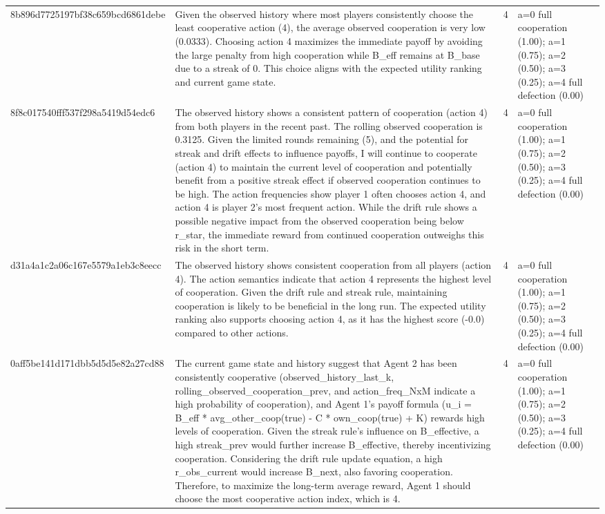 \begin{tabular}{lp{8cm}ll l}
8b896d7725197bf38c659bcd6861debe & Given the observed history where most players consistently choose the least cooperative action (4), the average observed cooperation is very low (0.0333). Choosing action 4 maximizes the immediate payoff by avoiding the large penalty from high cooperation while B\_eff remains at B\_base due to a streak of 0. This choice aligns with the expected utility ranking and current game state. & 4 & a=0 full cooperation (1.00); a=1 (0.75); a=2 (0.50); a=3 (0.25); a=4 full defection (0.00) &  \\
8f8c017540fff537f298a5419d54edc6 & The observed history shows a consistent pattern of cooperation (action 4) from both players in the recent past. The rolling observed cooperation is 0.3125. Given the limited rounds remaining (5), and the potential for streak and drift effects to influence payoffs, I will continue to cooperate (action 4) to maintain the current level of cooperation and potentially benefit from a positive streak effect if observed cooperation continues to be high.  The action frequencies show player 1 often chooses action 4, and action 4 is player 2's most frequent action. While the drift rule shows a possible negative impact from the observed cooperation being below r\_star, the immediate reward from continued cooperation outweighs this risk in the short term. & 4 & a=0 full cooperation (1.00); a=1 (0.75); a=2 (0.50); a=3 (0.25); a=4 full defection (0.00) &  \\
d31a4a1c2a06c167e5579a1eb3c8eecc & The observed history shows consistent cooperation from all players (action 4). The action semantics indicate that action 4 represents the highest level of cooperation. Given the drift rule and streak rule, maintaining cooperation is likely to be beneficial in the long run. The expected utility ranking also supports choosing action 4, as it has the highest score (-0.0) compared to other actions. & 4 & a=0 full cooperation (1.00); a=1 (0.75); a=2 (0.50); a=3 (0.25); a=4 full defection (0.00) &  \\
0aff5be141d171dbb5d5d5e82a27cd88 & The current game state and history suggest that Agent 2 has been consistently cooperative (observed\_history\_last\_k, rolling\_observed\_cooperation\_prev, and action\_freq\_NxM indicate a high probability of cooperation), and Agent 1's payoff formula (u\_i = B\_eff * avg\_other\_coop(true) - C * own\_coop(true) + K) rewards high levels of cooperation. Given the streak rule's influence on B\_effective, a high streak\_prev would further increase B\_effective, thereby incentivizing cooperation. Considering the drift rule update equation, a high r\_obs\_current would increase B\_next, also favoring cooperation. Therefore, to maximize the long-term average reward, Agent 1 should choose the most cooperative action index, which is 4. & 4 & a=0 full cooperation (1.00); a=1 (0.75); a=2 (0.50); a=3 (0.25); a=4 full defection (0.00) &  \\

\end{tabular}
